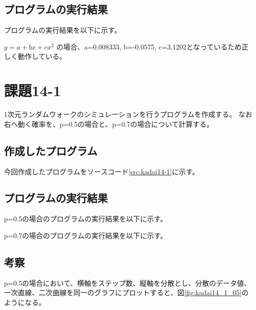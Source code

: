 \documentclass[11pt,titlepage]{jsarticle}
\begin{document}


\subsection{プログラムの実行結果}
プログラムの実行結果を以下に示す。
\begin{oframed}
\end{oframed}


$y=a+bx+cx^2$ の場合、a=0.008333, b=-0.0575, c=3.1202となっているため正しく動作している。

\section{課題14-1}
1次元ランダムウォークのシミュレーションを行うプログラムを作成する。
なお右へ動く確率を、p=0.5の場合と、p=0.7の場合について計算する。

\subsection{作成したプログラム}
今回作成したプログラムをソースコード\ref{src:kadai14-1}に示す。



\subsection{プログラムの実行結果}
p=0.5の場合のプログラムの実行結果を以下に示す。
\begin{oframed}
\end{oframed}

p=0.7の場合のプログラムの実行結果を以下に示す。
\begin{oframed}
\end{oframed}

\subsection{考察}
p=0.5の場合において、横軸をステップ数、縦軸を分散とし、分散のデータ値、一次直線、二次曲線を同一のグラフにプロットすると、図\ref{fig:kadai14_1_05}のようになる。
\end{document}
